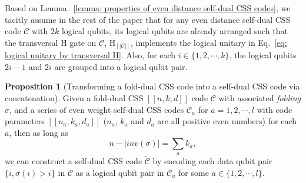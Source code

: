 \documentclass[reprint,aps,twocolumn,superscriptaddress,showpacs,notitlepage,10pt]{revtex4-2}
\theoremstyle{definition}
\newtheorem{proposition}[theorem]{Proposition}
\begin{document}
Based on Lemma.~\ref{lemma: properties of even distance self-dual CSS codes}, we tacitly assume in the rest of the paper that for any even distance self-dual CSS code $\mathcal{C}$ with $2k$ logical qubits, its logical qubits are already arranged such that the transversal $\mathrm{H}$ gate on $\mathcal{C}$, $\mathrm{H}_{[|\mathcal{C}|]}$, implements the logical unitary in Eq.~\ref{eq: logical unitary by transversal H}. Also, for each $i\in\{1,2,\cdots,k\}$, the logical qubits $2i-1$ and $2i$ are grouped into a logical qubit pair. 

\begin{proposition}
    [Transforming a fold-dual CSS code into a self-dual CSS code via concatenation] 
    \label{prop: construct self-dual css from fold-dual css}
    Given a fold-dual CSS $[[n,k,d]]$ code $\mathcal{C}$ with associated \textit{folding} $\sigma$, and a series of even weight self-dual CSS codes $\mathcal{C}_a$ for  $a=1,2,\cdots,l$  with code parameters $[[n_a,k_a,d_a]]$ ($n_a$, $k_a$ and $d_a$ are all positive even numbers) for each $a$, then as long as 
    \[n-|inv(\sigma)| = \sum_{a}k_a,\]
    we can construct a self-dual CSS code $\tilde{\mathcal{C}}$ by encoding each data qubit pair $\{i,\sigma(i)>i\}$ in $\mathcal{C}$ as a logical qubit pair in $\mathcal{C}_{a}$ for some $a\in\{1,2,\cdots,l\}$. 
\end{proposition}
\end{document}
